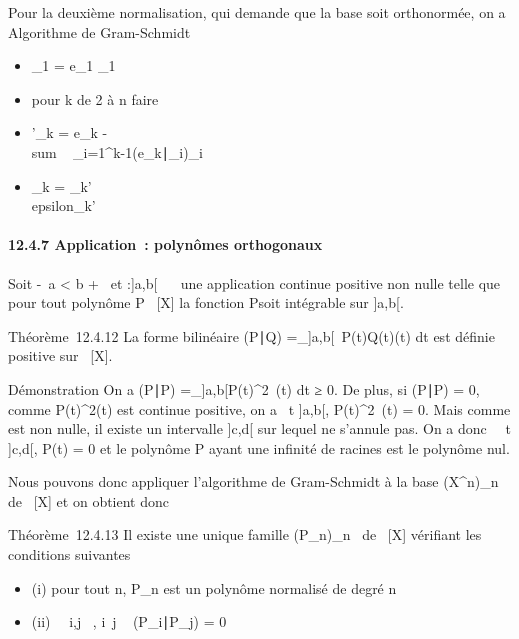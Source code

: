 \documentclass[]{article}
\begin{document}
Pour la deuxième normalisation, qui demande que la base soit
orthonormée, on a Algorithme de Gram-Schmidt

\begin{itemize}
\itemsep1pt\parskip0pt
\item
  \epsilon_1 = e_1\over
  \e_1\
\item
  pour k de 2 à n faire
\item
  \quad \quad \epsilon'_k = e_k
  -\\sum ~
  _i=1^k-1(e_k∣\epsilon_i)\epsilon_i
\item
  \quad \quad \epsilon_k =
  \epsilon_k'\over
  \\epsilon_k'\
\end{itemize}

\paragraph{12.4.7 Application~: polynômes orthogonaux}

Soit -\infty~\leq a < b \leq +\infty~ et \omega :]a,b[\rightarrow~ ~ une application
continue positive non nulle telle que pour tout polynôme P \in {}~[X] la
fonction P\omega soit intégrable sur ]a,b[.

Théorème~12.4.12 La forme bilinéaire (P∣Q)
=\int  _]a,b[~P(t)Q(t)\omega(t) dt est
définie positive sur \mathbb{R}~[X].

Démonstration On a (P∣P)
=\int  _]a,b[P(t)^2~\omega(t)
dt ≥ 0. De plus, si (P∣P) = 0, comme
P(t)^2\omega(t) est continue positive, on a
\forall~t \in]a,b[, P(t)^2~\omega(t) = 0. Mais
comme \omega est non nulle, il existe un intervalle ]c,d[ sur lequel \omega ne
s'annule pas. On a donc \forall~~t \in]c,d[, P(t) =
0 et le polynôme P ayant une infinité de racines est le polynôme nul.

Nous pouvons donc appliquer l'algorithme de Gram-Schmidt à la base
(X^n)_n\in{}~ de ~[X] et on obtient donc

Théorème~12.4.13 Il existe une unique famille
(P_n)_n\in{}~ de ~[X] vérifiant les conditions
suivantes

\begin{itemize}
\itemsep1pt\parskip0pt
\item
  (i) pour tout n, P_n est un polynôme normalisé de degré n
\item
  (ii) \forall~~i,j \in \mathbb{N}~,
  i\neq~j \rigtharrow~
  (P_i∣P_j) = 0
\end{itemize}
\end{document}
